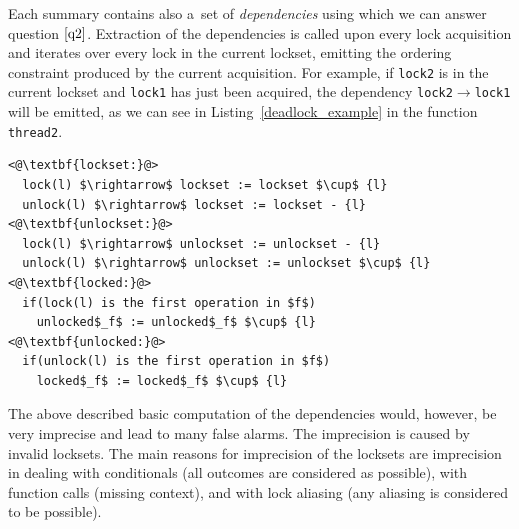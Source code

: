 \documentclass{ExcelAtFIT}
\begin{document}
Each summary contains also a~set of \textit{dependencies} using which we can answer question $\ref{q2}$. Extraction of the dependencies is called upon every lock acquisition and iterates over every lock in the current lockset, emitting the ordering constraint produced by the current acquisition. For example, if \texttt{lock2} is in the current lockset and \texttt{lock1} has just been acquired, the dependency \texttt{lock2$\rightarrow$lock1} will be emitted, as we can see in Listing~\ref{deadlock_example} in the function \texttt{thread2}.
\begin{lstlisting}[mathescape=true, keywordstyle=\ttfamily, float=tp, belowskip=-1 \baselineskip, label={summary_rules}, caption=Rules for summary computation ]
<@\textbf{lockset:}@>
  lock(l) $\rightarrow$ lockset := lockset $\cup$ {l}
  unlock(l) $\rightarrow$ lockset := lockset - {l}
<@\textbf{unlockset:}@>
  lock(l) $\rightarrow$ unlockset := unlockset - {l}
  unlock(l) $\rightarrow$ unlockset := unlockset $\cup$ {l}
<@\textbf{locked:}@>
  if(lock(l) is the first operation in $f$)
    unlocked$_f$ := unlocked$_f$ $\cup$ {l}
<@\textbf{unlocked:}@>
  if(unlock(l) is the first operation in $f$)
    locked$_f$ := locked$_f$ $\cup$ {l}
\end{lstlisting}


The above described basic computation of the dependencies would, however, be very imprecise and lead to many false alarms. The imprecision is caused by invalid locksets. The main reasons for imprecision of the locksets are imprecision in dealing with conditionals (all outcomes are considered as possible), with function calls (missing context), and with lock aliasing (any aliasing is considered to be possible).
\end{document}
